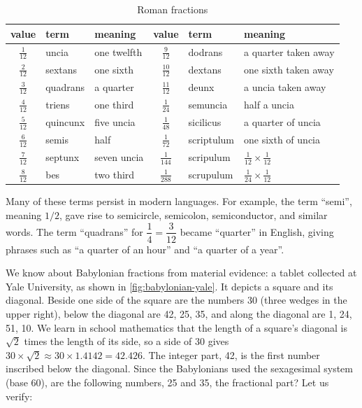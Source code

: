 \documentclass[b5paper]{article}
\begin{document}

\begin{table}[htbp]
  \centering
  \renewcommand{\arraystretch}{1.5}
  \begin{tabular}{|c|l|l||c|l|l|}
  \hline
  value & term & meaning & value & term & meaning \\
  \hline
  $\frac{1}{12}$ & uncia    & one twelfth & $\frac{9}{12}$ & dodrans    & a quarter taken away \\
  \hline
  $\frac{2}{12}$ & sextans  & one sixth & $\frac{10}{12}$ & dextans   & one sixth taken away \\
  \hline
  $\frac{3}{12}$ & quadrans & a quarter & $\frac{11}{12}$ & deunx    & a uncia taken away \\
  \hline
  $\frac{4}{12}$ & triens   & one third & $\frac{1}{24}$ & semuncia   & half a uncia  \\
  \hline
  $\frac{5}{12}$ & quincunx & five uncia & $\frac{1}{48}$ & sicilicus &  a quarter of uncia \\
  \hline
  $\frac{6}{12}$ & semis    & half    & $\frac{1}{72}$ & scriptulum    &  one sixth of uncia \\
  \hline
  $\frac{7}{12}$ & septunx  & seven uncia & $\frac{1}{144}$ & scripulum  &  $\frac{1}{12} \times \frac{1}{12}$ \\
  \hline
  $\frac{8}{12}$ & bes      & two third & $\frac{1}{288}$ & scrupulum    &  $\frac{1}{24} \times \frac{1}{12}$\\
  \hline
  \end{tabular}
  \caption{Roman fractions}
  \label{tab:roman-fractions}
\end{table}

Many of these terms persist in modern languages. For example, the term \enquote{semi}, meaning $1/2$, gave rise to semicircle, semicolon, semiconductor, and similar words. The term \enquote{quadrans} for $\dfrac{1}{4} = \dfrac{3}{12}$ became \enquote{quarter} in English, giving phrases such as \enquote{a quarter of an hour} and \enquote{a quarter of a year}.

We know about Babylonian fractions from material evidence: a tablet collected at Yale University, as shown in \cref{fig:babylonian-yale}. It depicts a square and its diagonal. Beside one side of the square are the numbers 30 (three wedges in the upper right), below the diagonal are 42, 25, 35, and along the diagonal are 1, 24, 51, 10. We learn in school mathematics that the length of a square's diagonal is $\sqrt{2}$ times the length of its side, so a side of 30 gives $30 \times \sqrt{2} \approx 30 \times 1.4142 = 42.426$. The integer part, 42, is the first number inscribed below the diagonal. Since the Babylonians used the sexagesimal system (base 60), are the following numbers, 25 and 35, the fractional part? Let us verify:
\end{document}
